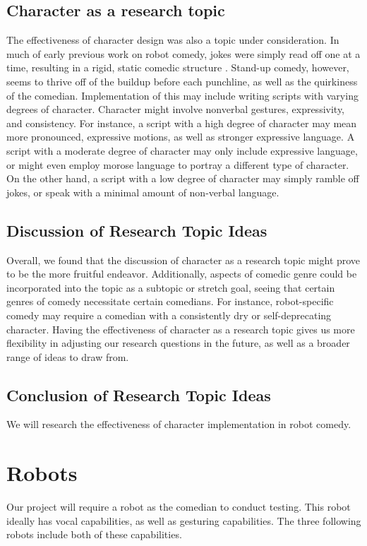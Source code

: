 \documentclass[onecolumn, draftclsnofoot,10pt, compsoc]{IEEEtran}
\begin{document}
\subsection{Character as a research topic}
The effectiveness of character design was also a topic under consideration.
In much of early previous work on robot comedy, jokes were simply read off one at a time, resulting in a rigid, static comedic structure \cite{RobotsMakeThings:2008}.
Stand-up comedy, however, seems to thrive off of the buildup before each punchline, as well as the quirkiness of the comedian.
Implementation of this may include writing scripts with varying degrees of character.
Character might involve nonverbal gestures, expressivity, and consistency.
For instance, a script with a high degree of character may mean more pronounced, expressive motions, as well as stronger expressive language.
A script with a moderate degree of character may only include expressive language, or might even employ morose language to portray a different type of character.
On the other hand, a script with a low degree of character may simply ramble off jokes, or speak with a minimal amount of non-verbal language.

\subsection{Discussion of Research Topic Ideas}
Overall, we found that the discussion of character as a research topic might prove to be the more fruitful endeavor.
Additionally, aspects of comedic genre could be incorporated into the topic as a subtopic or stretch goal, seeing that certain genres of comedy necessitate certain comedians.
For instance, robot-specific comedy may require a comedian with a consistently dry or self-deprecating character.
Having the effectiveness of character as a research topic gives us more flexibility in adjusting our research questions in the future, as well as a broader range of ideas to draw from.

\subsection{Conclusion of Research Topic Ideas}
We will research the effectiveness of character implementation in robot comedy.

\section{Robots}
Our project will require a robot as the comedian to conduct testing. This robot ideally has vocal capabilities, as well as gesturing capabilities. The three following robots include both of these capabilities.
\end{document}
